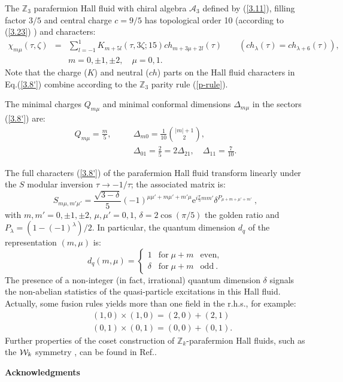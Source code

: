\documentclass[a4paper,12pt]{article}
\newcommand{\beq}{\begin{equation}}
\newcommand{\eeq}{\end{equation}}
\newcommand{\beqa}{\begin{eqnarray}}
\newcommand{\eeqa}{\end{eqnarray}}
\newcommand{\nn}{\nonumber \\}
\def \ex {\mathrm{e}}
\def \z {\zeta}
\def \A {{\mathcal A} }
\def \d {\delta}
\def \D {\Delta}
\def \t {\tau}
\def \Z {{\mathbb Z}}
\begin{document}
The $\Z_3$ parafermion Hall fluid with chiral algebra $\A_3$ defined by
(\ref{3.11}), filling factor $3/5$  and central charge $c=9/5$
has topological order 10 (according to (\ref{3.23}) ) and characters:
\beqa\label{3.8'}
\chi_{m \mu}(\t,\z)&=&\sum_{l=-1}^1 K_{m+5l} (\t,3\z;15) ch_{m+3\mu+2l}(\t)
\qquad (ch_\lambda(\t)=ch_{\lambda+6}(\t) ), \nn
&& m=0,\pm 1, \pm 2, \quad \mu=0,1.
\eeqa
Note that the charge ($K$) and neutral ($ch$) parts on the Hall fluid
characters in Eq.(\ref{3.8'}) combine according to the 
$\Z_3$ parity rule (\ref{p-rule}).
 
The minimal charges $Q_{m \mu}$ and minimal conformal
dimensions $\D_{m \mu}$ in the sectors (\ref{3.8'}) are:
\beqa\label{4.13}
 Q_{m \mu}=\frac{m}{5}, \quad &&\D_{m 0} =\frac{1}{10}{|m|+1 \choose 2},
\nn
&& \D_{01}=\frac{2}{5}=2\D_{2 1}, \quad \D_{11}=\frac{7}{10}.
\eeqa

The full characters (\ref{3.8'}) of the parafermion Hall fluid
transform linearly under the $S$ modular inversion $\tau \to -1/\tau$;
the associated matrix is:
\beq\label{3.10'}
S_{m\mu,m'\mu'}=\frac{\sqrt{3-\d}}{5}
(-1)^{\mu\mu' +m\mu'+m'\mu} \ex^{i\frac{\pi}{5} m m'}
\d^{P_{\mu+m+\mu'+m'}} \ ,
\eeq
with $m,m'=0,\pm1,\pm 2$,  $\mu,\mu'=0,1$,
$\delta=2 \cos (\pi/5)$ the golden ratio and
$P_{\lambda} = \left( 1-(-1)^{\lambda}\right)/2$.
In particular, the quantum dimension $d_{q}$ of the representation
$(m,\mu)$ is:
\beq\label{3.11'}
d_q(m,\mu)=
\left\{ \begin{array}{rll} 1 & \mathrm{for} \; \mu+m & \mathrm{even} , \\
\d & \mathrm{for} \; \mu+m & \mathrm{odd}\ . \end{array} \right.
\eeq
The presence of a non-integer (in fact, irrational) quantum dimension
$\d$ signals the non-abelian statistics of the quasi-particle
excitations in this Hall fluid. Actually, some fusion
rules yields more than one field in the r.h.s., for example:
\beqa\label{3.12'}
&&(1,0) \times (1,0) = (2,0) + (2,1)  \nn
&&(0,1) \times (0,1) = (0,0) + (0,1).
\eeqa
Further properties of the coset construction of 
$\Z_k$-parafermion Hall fluids, such as the ${\cal W}_k$ symmetry
\cite{ctz}, can be found in Ref.\cite{cgt2}.

\bigskip
{\bf Acknowledgments}
\end{document}
